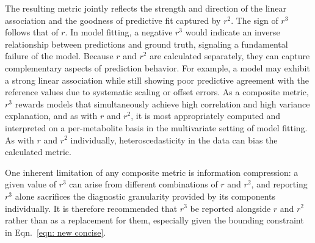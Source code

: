 The resulting metric jointly reflects the strength and direction of the linear association and the goodness of predictive fit captured by $r^2$. The sign of $r^3$ follows that of $r$. In model fitting, a negative $r^3$ would indicate an inverse relationship between predictions and ground truth, signaling a fundamental failure of the model. Because $r$ and $r^2$ are calculated separately, they can capture complementary aspects of prediction behavior. For example, a model may exhibit a strong linear association while still showing poor predictive agreement with the reference values due to systematic scaling or offset errors. 
As a composite metric, $r^3$ rewards models that simultaneously achieve high correlation and high variance explanation, and as with $r$ and $r^2$, it is most appropriately computed and interpreted on a per-metabolite basis in the multivariate setting of model fitting. As with $r$ and $r^2$ individually, heteroscedasticity in the data can bias the calculated metric.

One inherent limitation of any composite metric is information compression: a given value of $r^3$ can arise from different combinations of $r$ and $r^2$, and reporting $r^3$ alone sacrifices the diagnostic granularity provided by its components individually. It is therefore recommended that $r^3$ be reported alongside $r$ and $r^2$ rather than as a replacement for them, especially given the bounding constraint in Eqn.~\ref{eqn: new concise}.

